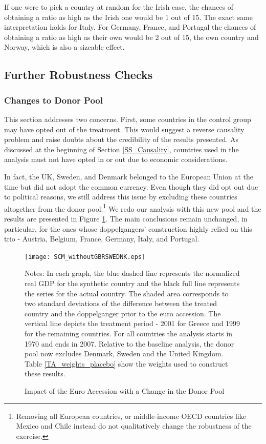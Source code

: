 \documentclass[12pt]{article}
\newcommand{\annote}[1]{\parbox{\textwidth}{\renewcommand{\baselinestretch}{1.0}\vspace{12pt} \small Notes: #1}}
\begin{document}
If one were to pick a country at random for the Irish case, the chances of obtaining a ratio as high as the Irish one would be 1 out of 15. The exact same interpretation holds for Italy. For Germany, France, and Portugal the chances of obtaining a ratio as high as their own would be 2 out of 15, the own country and Norway, which is also a sizeable effect.

\subsection{Further Robustness Checks} 

\subsubsection{Changes to Donor Pool \label{SS_donor}}

This section addresses two concerns. First, some countries in the control group may have opted out of the treatment. This would suggest a reverse causality problem and raise doubts about the credibility of the results presented. As discussed at the beginning of Section \ref{SS_Causality}, countries used in the analysis must not have opted in or out due to economic considerations. 

In fact, the UK, Sweden, and Denmark belonged to the European Union at the time but did not adopt the common currency. Even though they did opt out due to political reasons, we still address this issue by excluding these countries altogether from the donor pool.\footnote{Removing all European countries, or middle-income OECD countries like Mexico and Chile instead do not qualitatively change the robustness of the exercise.} We redo our analysis with this new pool and the results are presented in Figure \ref{F_donor}. The main conclusions remain unchanged, in particular, for the ones whose doppelgangers' construction highly relied on this trio - Austria, Belgium, France, Germany, Italy, and Portugal.


\begin{figure}[h!]
    \centering
    \caption{Impact of the Euro Accession with a Change in the Donor Pool \label{F_donor}}
    \texttt{[image: SCM\_withoutGBRSWEDNK.eps]}
    \annote{In each graph, the blue dashed line represents the normalized real GDP for the synthetic country and the black full line represents the series for the actual country. The shaded area corresponds to two standard deviations of the difference between the treated country and the doppelganger prior to the euro accession. The vertical line depicts the treatment period - 2001 for Greece and 1999 for the remaining countries. For all countries the analysis starts in 1970 and ends in 2007. Relative to the baseline analysis, the donor pool now excludes Denmark, Sweden and the United Kingdom. Table \ref{TA_weights_placebo} show the weights used to construct these results.}
\end{figure}
\end{document}
